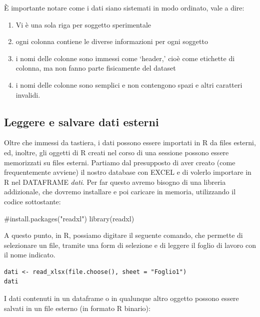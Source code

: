 \documentclass[a4paper,12pt,oneside]{book}
\providecommand{\tightlist}{%
  \setlength{\itemsep}{0pt}\setlength{\parskip}{0pt}}
\newenvironment{Shaded}{\begin{snugshade}}{\end{snugshade}}
\newcommand{\CommentTok}[1]{#1}
\newcommand{\FunctionTok}[1]{#1}
\newcommand{\NormalTok}[1]{#1}
\begin{document}
È importante notare come i dati siano sistemati in modo ordinato, vale a dire:

\begin{enumerate}
\def\labelenumi{\arabic{enumi}.}
\tightlist
\item
  Vi è una sola riga per soggetto sperimentale
\item
  ogni colonna contiene le diverse informazioni per ogni soggetto
\item
  i nomi delle colonne sono immessi come `header,' cioè come etichette di colonna, ma non fanno parte fisicamente del dataset
\item
  i nomi delle colonne sono semplici e non contengono spazi e altri caratteri invalidi.
\end{enumerate}

\hypertarget{leggere-e-salvare-dati-esterni}{%
\subsection*{Leggere e salvare dati esterni}\label{leggere-e-salvare-dati-esterni}}

Oltre che immessi da tastiera, i dati possono essere importati in R da files esterni, ed, inoltre, gli oggetti di R creati nel corso di una sessione possono essere memorizzati su files esterni. Partiamo dal presupposto di aver creato (come frequentemente avviene) il nostro database con EXCEL e di volerlo importare in R nel DATAFRAME \emph{dati}. Per far questo avremo bisogno di una libreria addizionale, che dovremo installare e poi caricare in memoria, utilizzando il codice sottostante:

\begin{Shaded}
\begin{Highlighting}[]
\CommentTok{\#install.packages("readxl")}
\FunctionTok{library}\NormalTok{(readxl)}
\end{Highlighting}
\end{Shaded}

A questo punto, in R, possiamo digitare il seguente comando, che permette di selezionare un file, tramite una form di selezione e di leggere il foglio di lavoro con il nome indicato.

\begin{verbatim}
dati <- read_xlsx(file.choose(), sheet = "Foglio1")
dati
\end{verbatim}

I dati contenuti in un dataframe o in qualunque altro oggetto possono essere salvati in un file esterno (in formato R binario):
\end{document}
